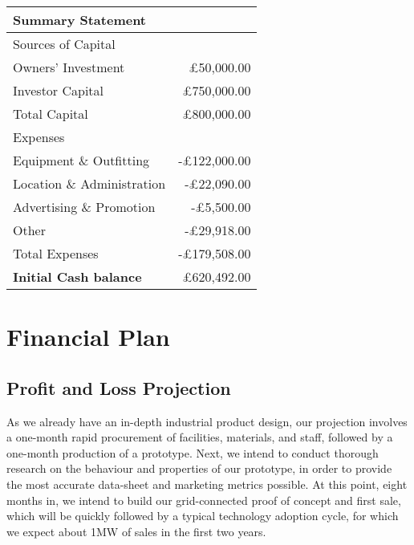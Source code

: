 \documentclass[a4paper,11pt]{article}
\begin{document}
\vspace{1cm}

\begin{tabular}{l r}
	Summary Statement & \\
	\hline
	Sources of Capital & \\
	Owners' Investment & £50,000.00 \\
	Investor Capital & £750,000.00 \\
	Total Capital & £800,000.00 \\
	\hline
	Expenses & \\
	Equipment \& Outfitting & -£122,000.00 \\
	Location \& Administration & -£22,090.00 \\
	Advertising \& Promotion & -£5,500.00 \\
	Other & -£29,918.00 \\
	Total Expenses & -£179,508.00 \\
	\hline
	\textbf{Initial Cash balance} & £620,492.00 \\
\end{tabular}
\pagebreak

\section{Financial Plan}
\subsection{Profit and Loss Projection}
As we already have an in-depth industrial product design, our projection involves a one-month rapid procurement of facilities, materials, and staff, followed by a one-month production of a prototype. Next, we intend to conduct thorough research on the behaviour and properties of our prototype, in order to provide the most accurate data-sheet and marketing metrics possible. At this point, eight months in, we intend to build our grid-connected proof of concept and first sale, which will be quickly followed by a typical technology adoption cycle, for which we expect about 1MW of sales in the first two years.
\end{document}
